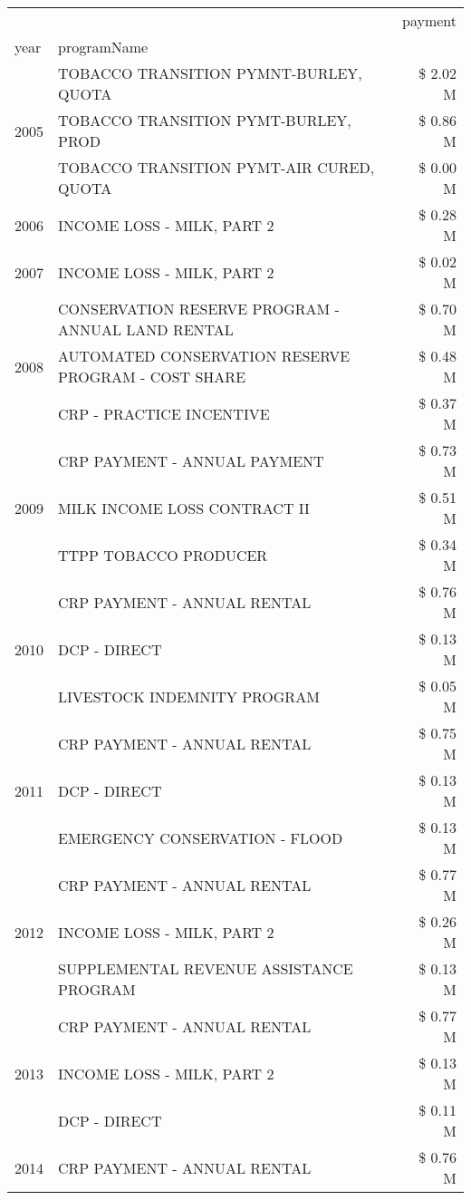 \begin{tabular}{llr}
\toprule
 &  & payment \\
year & programName &  \\
\midrule
\multirow[t]{3}{*}{2005} & TOBACCO TRANSITION PYMNT-BURLEY, QUOTA & \$ 2.02 M \\
 & TOBACCO TRANSITION PYMT-BURLEY, PROD & \$ 0.86 M \\
 & TOBACCO TRANSITION PYMT-AIR CURED, QUOTA & \$ 0.00 M \\
\cline{1-3}
2006 & INCOME LOSS - MILK, PART 2 & \$ 0.28 M \\
\cline{1-3}
2007 & INCOME LOSS - MILK, PART 2 & \$ 0.02 M \\
\cline{1-3}
\multirow[t]{3}{*}{2008} & CONSERVATION RESERVE PROGRAM - ANNUAL LAND RENTAL & \$ 0.70 M \\
 & AUTOMATED CONSERVATION RESERVE PROGRAM - COST SHARE & \$ 0.48 M \\
 & CRP - PRACTICE INCENTIVE & \$ 0.37 M \\
\cline{1-3}
\multirow[t]{3}{*}{2009} & CRP PAYMENT - ANNUAL PAYMENT & \$ 0.73 M \\
 & MILK INCOME LOSS CONTRACT II & \$ 0.51 M \\
 & TTPP TOBACCO PRODUCER & \$ 0.34 M \\
\cline{1-3}
\multirow[t]{3}{*}{2010} & CRP PAYMENT - ANNUAL RENTAL & \$ 0.76 M \\
 & DCP - DIRECT & \$ 0.13 M \\
 & LIVESTOCK INDEMNITY PROGRAM & \$ 0.05 M \\
\cline{1-3}
\multirow[t]{3}{*}{2011} & CRP PAYMENT - ANNUAL RENTAL & \$ 0.75 M \\
 & DCP - DIRECT & \$ 0.13 M \\
 & EMERGENCY CONSERVATION - FLOOD & \$ 0.13 M \\
\cline{1-3}
\multirow[t]{3}{*}{2012} & CRP PAYMENT - ANNUAL RENTAL & \$ 0.77 M \\
 & INCOME LOSS - MILK, PART 2 & \$ 0.26 M \\
 & SUPPLEMENTAL REVENUE ASSISTANCE PROGRAM & \$ 0.13 M \\
\cline{1-3}
\multirow[t]{3}{*}{2013} & CRP PAYMENT - ANNUAL RENTAL & \$ 0.77 M \\
 & INCOME LOSS - MILK, PART 2 & \$ 0.13 M \\
 & DCP - DIRECT & \$ 0.11 M \\
\cline{1-3}
\multirow[t]{3}{*}{2014} & CRP PAYMENT - ANNUAL RENTAL & \$ 0.76 M \\

\end{tabular}
